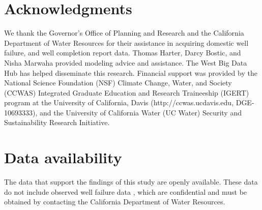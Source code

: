 \clearpage



\section{Acknowledgments}
We thank the Governor's Office of Planning and Research and the California Department of Water Resources for their assistance in acquiring domestic well failure, and well completion report data. Thomas Harter, Darcy Bostic, and Nisha Marwaha provided modeling advice and assistance. The West Big Data Hub has helped disseminate this research. Financial support was provided by the National Science Foundation (NSF) Climate Change, Water, and Society (CCWAS) Integrated Graduate Education and Research Traineeship (IGERT) program at the University of California, Davis (http://ccwas.ucdavis.edu, DGE-10693333), and the University of California Water (UC Water) Security and Sustainability Research Initiative.


\section{Data availability}
The data that support the findings of this study are openly available. These data\citep{Pauloo2019} do not include observed well failure data \citep{observedDW}, which are confidential and must be obtained by contacting the California Department of Water Resources. 

\clearpage